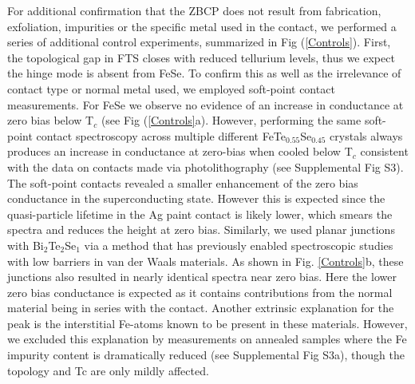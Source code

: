 For additional confirmation that the ZBCP does not result from fabrication, exfoliation, impurities or the specific metal used in the contact, we performed a series of additional control experiments, summarized in Fig (\ref{Controls}). First, the topological gap in FTS closes with reduced tellurium levels, thus we expect the hinge mode is absent from FeSe. To confirm this as well as the irrelevance of contact type or normal metal used, we employed soft-point contact measurements. For FeSe we observe no evidence of an increase in conductance at zero bias below T$_{c}$ (see Fig (\ref{Controls}a). However, performing the same soft-point contact spectroscopy across multiple different FeTe$_{0.55}$Se$_{0.45}$ crystals always produces an increase in conductance at zero-bias when cooled below T$_{c}$ consistent with the data on contacts made via photolithography (see Supplemental Fig S3). The soft-point contacts revealed a smaller enhancement of the zero bias conductance in the superconducting state. However this is expected since the quasi-particle lifetime in the Ag paint contact is likely lower, which smears the spectra and reduces the height at zero bias. Similarly, we used planar junctions with Bi$_{2}$Te$_{2}$Se$_{1}$ via a method that has previously enabled spectroscopic studies with low barriers in van der Waals materials.\cite{Zareapour2012} As shown in Fig. \ref{Controls}b, these junctions also resulted in nearly identical spectra near zero bias. Here the lower zero bias conductance is expected as it contains contributions from the normal material being in series with the contact. Another extrinsic explanation for the peak is the interstitial Fe-atoms known to be present in these materials. However, we excluded this explanation by measurements on annealed samples where the Fe impurity content is dramatically reduced (see Supplemental Fig S3a), though the topology and Tc are only mildly affected.

